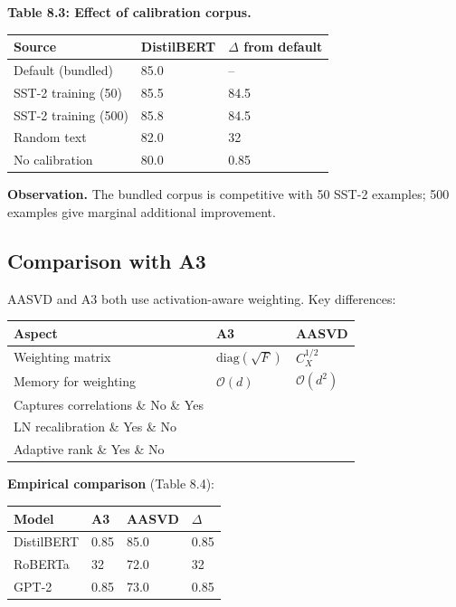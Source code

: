 \textbf{Table 8.3: Effect of calibration corpus.}

\begin{table}[H]
\centering
\small
\begin{tabular}{lll}
\toprule
\textbf{Source} & \textbf{DistilBERT} & \textbf{$\Delta$ from default} \\
\midrule
Default (bundled) & 85.0 & -- \\
SST-2 training (50) & 85.5 & 84.5 \\
SST-2 training (500) & 85.8 & 84.5 \\
Random text & 82.0 & 32 \\
No calibration & 80.0 & 0.85 \\
\bottomrule
\end{tabular}
\end{table}

\textbf{Observation.} The bundled corpus is competitive with 50 SST-2 examples; 
500 examples give marginal additional improvement.

\subsection{Comparison with A3}

AASVD and A3 both use activation-aware weighting. Key differences:

\begin{table}[H]
\centering
\small
\begin{tabular}{lll}
\toprule
\textbf{Aspect} & \textbf{A3} & \textbf{AASVD} \\
\midrule
Weighting matrix & $\mathrm{diag}(\sqrt{F})$ & $C_X^{1/2}$ \\
Memory for weighting & $\mathcal{O}(d)$ & $\mathcal{O}(d^2)$ \\
Captures correlations \& No \& Yes \\
LN recalibration \& Yes \& No \\
Adaptive rank \& Yes \& No \\
\bottomrule
\end{tabular}
\end{table}

\textbf{Empirical comparison} (Table 8.4):

\begin{table}[H]
\centering
\small
\begin{tabular}{llll}
\toprule
\textbf{Model} & \textbf{A3} & \textbf{AASVD} & \textbf{$\Delta$} \\
\midrule
DistilBERT & 0.85 & 85.0 & 0.85 \\
RoBERTa & 32 & 72.0 & 32 \\
GPT-2 & 0.85 & 73.0 & 0.85 \\
\bottomrule
\end{tabular}
\end{table}

